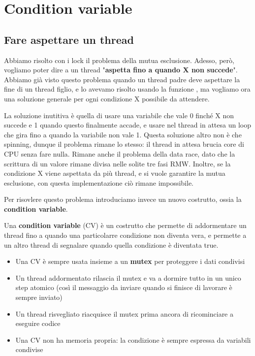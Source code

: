 \documentclass[11pt, a4paper, titlepage, oneside]{scrbook}
\begin{document}
\section{Condition variable}

\subsection{Fare aspettare un thread}

Abbiamo risolto con i lock il problema della mutua esclusione. Adesso, però, vogliamo poter dire a un thread "\textbf{aspetta fino a quando X non succede}". Abbiamo già visto questo problema quando un thread padre deve aspettare la fine di un thread figlio, e lo avevamo risolto usando la funzione , ma vogliamo ora una soluzione generale per ogni condizione X possibile da attendere.

La soluzione inutitiva è quella di usare una variabile che vale 0 finché X non succede e 1 quando questo finalmente accade, e usare nel thread in attesa
un loop che gira fino a quando la variabile non vale 1. Questa soluzione altro non è che spinning, dunque il problema rimane lo stesso: il thread in attesa brucia core di CPU senza fare nulla. Rimane anche il problema della data race, dato che la scrittura di un valore rimane divisa nelle solite tre fasi RMW. Inoltre, se la condizione X viene aspettata da più thread, e si vuole garantire la mutua esclusione, con questa implementazione ciò rimane impossibile. 

Per risovlere questo problema introduciamo invece un nuovo costrutto, ossia la \textbf{condition variable}.

\begin{Definizione}
\label{def-CV}
Una \textbf{condition variable} (CV) è un costrutto che permette di addormentare un thread fino a quando una particolarre condizione non diventa vera, e permette a un altro thread di segnalare quando quella condizione è diventata true. 
\end{Definizione}

\begin{Proprieta}
\label{prop-CV}
\begin{itemize}
    \item Una CV è sempre usata insieme a un \textbf{mutex} per proteggere i dati condivisi
    \item Un thread addormentato rilascia il mutex e va a dormire tutto in un unico step atomico (così il messaggio da inviare quando si finisce di lavorare è sempre inviato)
    \item Un thread risvegliato riacquisce il mutex prima ancora di ricominciare a eseguire codice
    \item Una CV non ha memoria propria: la condizione è sempre espressa da variabili condivise 
\end{itemize}
\end{Proprieta}
\end{document}
